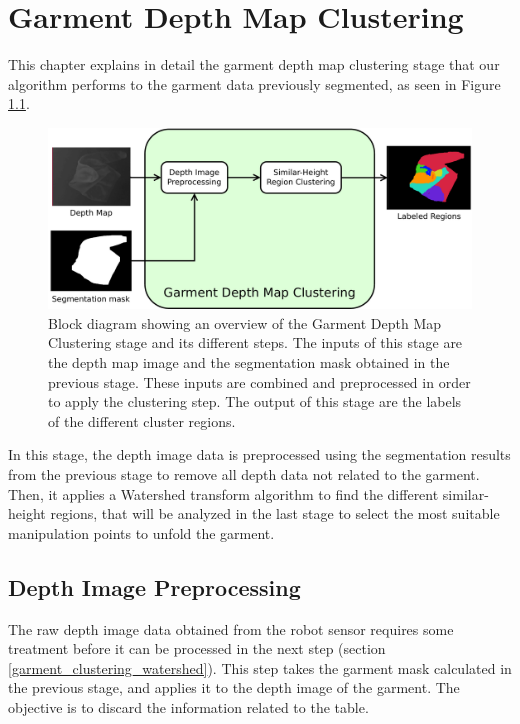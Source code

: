 \chapter{Garment Depth Map Clustering}
\label{garment_clustering}

This chapter explains in detail the garment depth map clustering stage that our algorithm performs to the garment data previously segmented, as seen in Figure \ref{fig:garment_clustering_blocks}.

\begin{figure}[thpb]
    \centering
    \includegraphics[width=\textwidth]
    {figures/Garment-depthmap-diagram.pdf}
    \caption{Block diagram showing an overview of the Garment Depth Map Clustering stage and its different steps. The inputs of this stage are the depth map image and the segmentation mask obtained in the previous stage. These inputs are combined and preprocessed in order to apply the clustering step. The output of this stage are the labels of the different cluster regions.}
    \label{fig:garment_clustering_blocks}
\end{figure}

In this stage, the depth image data is preprocessed using the segmentation results from the previous stage to remove all depth data not related to the garment. Then, it applies a Watershed transform algorithm to find the different similar-height regions, that will be analyzed in the last stage to select the most suitable manipulation points to unfold the garment.


\section{Depth Image Preprocessing}
\label{depth_image_preprocessing}

The raw depth image data obtained from the robot sensor requires some treatment before it can be processed in the next step (section \ref{garment_clustering_watershed}). This step takes the garment mask calculated in the previous stage, and applies it to the depth image of the garment. The objective is to discard the information related to the table. 


